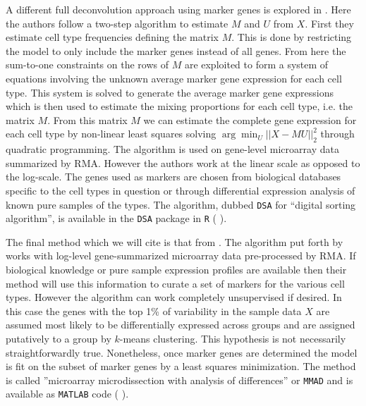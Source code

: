 \documentclass[reqno,12pt,oneside]{report}\usepackage[]{graphicx}\usepackage[]{color}
\renewcommand{\citet}[1]{(\citeauthor{#1} \citeyear{#1})}
\theoremstyle{plain}
\theoremstyle{definition}
\theoremstyle{remark}
\numberwithin{theorem}{chapter}     %
\begin{document}
A different full deconvolution approach using marker genes is explored in \cite{Zhong2013}. Here the authors follow a two-step algorithm to estimate $M$ and $U$ from $X$. First they estimate cell type frequencies defining the matrix $M$. This is done by restricting the model to only include the marker genes instead of all genes. From here the sum-to-one constraints on the rows of $M$ are exploited to form a system of equations involving the unknown average marker gene expression for each cell type. This system is solved to generate the average marker gene expressions which is then used to estimate the mixing proportions for each cell type, i.e. the matrix $M$. From this matrix $M$ we can estimate the complete gene expression for each cell type by non-linear least squares solving $\arg\min_U||X-MU||_2^2$ through quadratic programming. The algorithm is used on gene-level microarray data summarized by RMA. However the authors work at the linear scale as opposed to the log-scale. The genes used as markers are chosen from biological databases specific to the cell types in question or through differential expression analysis of known pure samples of the types. The algorithm, dubbed \verb+DSA+ for ``digital sorting algorithm'', is available in the \verb+DSA+ package in \verb+R+  \citet{Zhong2013}.

The final method which we will cite is that from \cite{Liebner2014}. The algorithm put forth by \citeauthor{Liebner2014} works with log-level gene-summarized microarray data pre-processed by RMA. If biological knowledge or pure sample expression profiles are available then their method will use this information to curate a set of markers for the various cell types. However the algorithm can work completely unsupervised if desired. In this case the genes with the top 1\% of variability in the sample data $X$ are assumed most likely to be differentially expressed across groups and are assigned putatively to a group by $k$-means clustering. This hypothesis is not necessarily straightforwardly true. Nonetheless, once marker genes are determined the model is fit on the subset of marker genes by a least squares minimization. The method is called ''microarray microdissection with analysis of differences'' or \verb+MMAD+ and is available as \verb+MATLAB+ code \citet{Liebner2014}.
\end{document}
